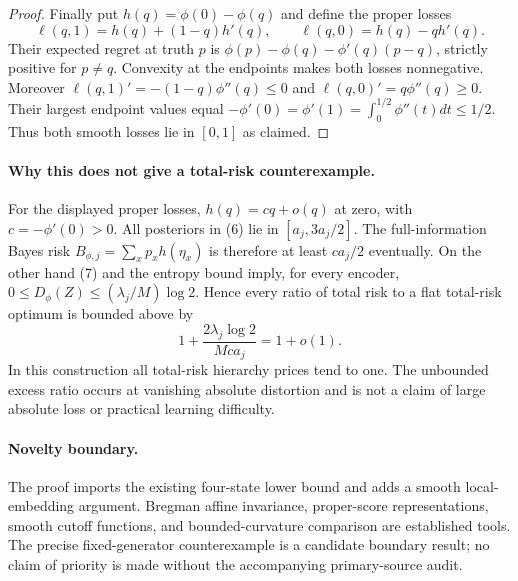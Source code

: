 \begin{proof}
Finally put $h(q)=\phi(0)-\phi(q)$ and define the proper losses
\[
 \ell(q,1)=h(q)+(1-q)h'(q),\qquad
 \ell(q,0)=h(q)-qh'(q).
\]
Their expected regret at truth $p$ is
$\phi(p)-\phi(q)-\phi'(q)(p-q)$, strictly positive for $p\ne q$.
Convexity at the endpoints makes both losses nonnegative.  Moreover
$\ell(q,1)'=-(1-q)\phi''(q)\leq0$ and
$\ell(q,0)'=q\phi''(q)\geq0$.  Their largest endpoint values equal
$-\phi'(0)=\phi'(1)=\int_0^{1/2}\phi''(t)dt\leq1/2$.
Thus both smooth losses lie in $[0,1]$ as claimed.
\end{proof}

\paragraph{Why this does not give a total-risk counterexample.}
For the displayed proper losses, $h(q)=cq+o(q)$ at zero, with
$c=-\phi'(0)>0$.  All posteriors in (6) lie in $[a_j,3a_j/2]$.
The full-information Bayes risk $B_{\phi,j}=\sum_xp_xh(\eta_x)$ is
therefore at least $ca_j/2$ eventually.  On the other hand (7) and
the entropy bound imply, for every encoder,
$0\leq D_\phi(Z)\leq(\lambda_j/M)\log2$.  Hence every ratio of total
risk to a flat total-risk optimum is bounded above by
\[
 1+\frac{2\lambda_j\log2}{Mca_j}=1+o(1).
\]
In this construction all total-risk hierarchy prices tend to one.  The
unbounded excess ratio occurs at vanishing absolute distortion and is
not a claim of large absolute loss or practical learning difficulty.

\paragraph{Novelty boundary.}
The proof imports the existing four-state lower bound and adds a smooth
local-embedding argument.  Bregman affine invariance, proper-score
representations, smooth cutoff functions, and bounded-curvature
comparison are established tools.  The precise fixed-generator
counterexample is a candidate boundary result; no claim of priority is
made without the accompanying primary-source audit.
